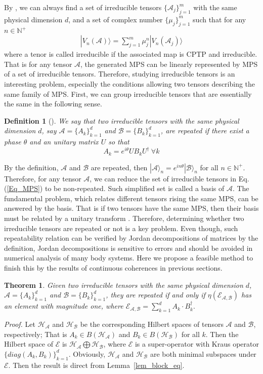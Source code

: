 \documentclass[journal]{IEEEtran}
\def\h{\ensuremath{\mathcal{H}}}
\def\a{\ensuremath{\mathcal{A}}}
\def\b{\ensuremath{\mathcal{B}}}
\def\e{\ensuremath{\mathcal{E}}}
\newtheorem{theorem}{Theorem}
\newtheorem{definition}{Definition}
\begin{document}
By \cite{cuevas2017irreducible}, we can always find a set of irreducible tensors $\{\a_{j}\}_{j=1}^{m}$ with the same physical dimension $d$, and a set of complex number $\{\mu_{j}\}_{j=1}^{m}$ such that for any $n\in\mathbb{N^{+}}$
\begin{eqnarray}\label{Eq_MPS}
  |V_n(\a)\rangle=\sum_{j=1}^{m}\mu_j^{n}|V_n(\a_{j})\rangle
\end{eqnarray}
where a tenor is called irreducible if the associated map is CPTP and irreducible. That is for any tensor $\a$,  the generated MPS can be linearly represented by MPS of a set of irreducible tensors. Therefore, studying irreducible tensors is an interesting problem, especially the conditions allowing two tensors describing the same family of
MPS.
First, we can group irreducible tensors that are essentially the same in the following sense.
\begin{definition}[\cite{cuevas2017irreducible}]
  We say that two irreducible tensors with the same physical dimension $d$, say $\a=\{A_{k}\}_{k=1}^{d}$ and $\b=\{B_{k}\}_{k=1}^{d}$, are repeated if there exist a phase $\theta$ and an unitary matrix $U$ so that 
  $$A_{k}=e^{i\theta}UB_kU^\dagger \ \forall k$$
\end{definition}

By the definition, $\a$ and $\b$ are repeated, then $|\a\rangle_{n}=e^{in\theta}|\b\rangle_{n}$ for all $n\in \mathbb{N^+}$. Therefore, for any tensor $\a$, we can reduce the set of irreducible tensors  in Eq.(\ref{Eq_MPS}) to be non-repeated. Such simplified set is called a basis of $\a$. The fundamental problem, which relates different tensors rising the same MPS, can be answered by the basis. That is if two tensors have the same MPS, then their basis must be related by a unitary transform \cite{cuevas2017irreducible}. Therefore, determining whether two irreducible tensors are  repeated or not  is a key problem. Even though, such repeatability relation can be verified by Jordan decompositions of matrices by the definition, Jordan decompositions is sensitive to errors and should be avoided in numerical analysis of many body systems. Here we propose a feasible method to finish this by the results of continuous coherences in previous sections. 
\begin{theorem}
  Given two irreducible tensors with the same physical dimension $d$, $\a=\{A_{k}\}_{k=1}^{d}$ and $\b=\{B_{k}\}_{k=1}^{d}$, they are repeated if and only if $\eta(\e_{\a,\b})$ has an element with magnitude one, where $\e_{\a,\b}=\sum_{k=1}^d A_{k}\cdot B_{k}^\dagger.$
\end{theorem}
{\it Proof.} Let $\h_\a$ and $\h_\b$ be the corresponding Hilbert spaces of tensors $\a$ and $\b$, respectively; That is $A_k\in B(\h_\a)$ and $B_k\in B(\h_\b)$ for all $k$.  Then  the  Hilbert space of $\e$ is $\h_\a\bigoplus \h_\b$, where $\e$ is a super-operator with Kraus operator $\{diag(A_k,B_k)\}_{k=1}^d$. Obviously, $\h_\a$ and $\h_\b$ are both minimal subspaces under $\e$. Then the result is direct from Lemma~\ref{lem_block_eq}. 
\end{document}
